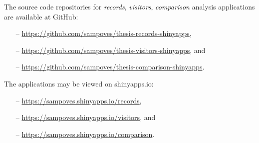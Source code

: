 The source code repositories for \textit{records}, \textit{visitors}, \textit{comparison} analysis applications are available at GitHub: 
\begin{spacing}{1}
    \begin{enumerate}
        \item[--] \textcolor{blue}{\url{https://github.com/sampoves/thesis-records-shinyapps}},
        \item[--] \textcolor{blue}{\url{https://github.com/sampoves/thesis-visitors-shinyapps}}, and
        \item[--] \textcolor{blue}{\url{https://github.com/sampoves/thesis-comparison-shinyapps}}.
    \end{enumerate}
\end{spacing}
\bigskip

\noindent
The applications may be viewed on shinyapps.io:
\begin{spacing}{1}
    \begin{enumerate}
        \item[--] \textcolor{blue}{\url{https://sampoves.shinyapps.io/records}},
        \item[--] \textcolor{blue}{\url{https://sampoves.shinyapps.io/visitors}}, and
        \item[--] \textcolor{blue}{\url{https://sampoves.shinyapps.io/comparison}}.
    \end{enumerate}
\end{spacing}